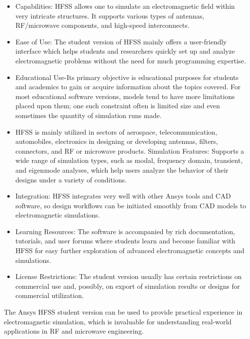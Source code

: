 \documentclass[12pt]{article}
\begin{document}
\begin{itemize}
    \item Capabilities: HFSS allows one to simulate an electromagnetic field within very intricate structures. It supports various types of antennas, RF/microwave components, and high-speed interconnects.

    \item Ease of Use: The student version of HFSS mainly offers a user-friendly interface which helps students and researchers quickly set up and analyze electromagnetic problems without the need for much programming expertise.

    \item Educational Use-Its primary objective is educational purposes for students and academics to gain or acquire information about the topics covered. For most educational software versions, models tend to have more limitations placed upon them; one such constraint often is limited size and even sometimes the quantity of simulation runs made.

    \item HFSS is mainly utilized in sectors of aerospace, telecommunication, automobiles, electronics in designing or developing antennas, filters, connectors, and RF or microwave products. Simulation Features: Supports a wide range of simulation types, such as modal, frequency domain, transient, and eigenmode analyses, which help users analyze the behavior of their designs under a variety of conditions.

    \item Integration: HFSS integrates very well with other Ansys tools and CAD software, so design workflows can be initiated smoothly from CAD models to electromagnetic simulations.

    \item Learning Resources: The software is accompanied by rich documentation, tutorials, and user forums where students learn and become familiar with HFSS for easy further exploration of advanced electromagnetic concepts and simulations.

    \item License Restrictions: The student version usually has certain restrictions on commercial use and, possibly, on export of simulation results or designs for commercial utilization.

\end{itemize}

\par The Ansys HFSS student version can be used to provide practical experience in electromagnetic simulation, which is invaluable for understanding real-world applications in RF and microwave engineering.
\end{document}
